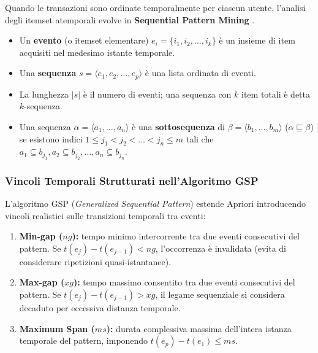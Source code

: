 Quando le transazioni sono ordinate temporalmente per ciascun utente, l'analisi degli itemset atemporali evolve in \textbf{Sequential Pattern Mining} \cite{agrawal1995}.
\begin{itemize}
    \item Un \textbf{evento} (o itemset elementare) $e_i = \{i_1, i_2, \dots, i_k\}$ è un insieme di item acquisiti nel medesimo istante temporale.
    \item Una \textbf{sequenza} $s = \langle e_1, e_2, \dots, e_p \rangle$ è una lista ordinata di eventi.
    \item La lunghezza $|s|$ è il numero di eventi; una sequenza con $k$ item totali è detta $k$-sequenza.
    \item Una sequenza $\alpha = \langle a_1, \dots, a_n \rangle$ è una \textbf{sottosequenza} di $\beta = \langle b_1, \dots, b_m \rangle$ ($\alpha \sqsubseteq \beta$) se esistono indici $1 \le j_1 < j_2 < \dots < j_n \le m$ tali che $a_1 \subseteq b_{j_1}, a_2 \subseteq b_{j_2}, \dots, a_n \subseteq b_{j_n}$.
\end{itemize}

\subsubsection{Vincoli Temporali Strutturati nell'Algoritmo GSP}
L'algoritmo GSP (\textit{Generalized Sequential Pattern}) estende Apriori introducendo vincoli realistici sulle transizioni temporali tra eventi:
\begin{enumerate}
    \item \textbf{Min-gap ($ng$):} tempo minimo intercorrente tra due eventi consecutivi del pattern. Se $t(e_j) - t(e_{j-1}) < ng$, l'occorrenza è invalidata (evita di considerare ripetizioni quasi-istantanee).
    \item \textbf{Max-gap ($xg$):} tempo massimo consentito tra due eventi consecutivi del pattern. Se $t(e_j) - t(e_{j-1}) > xg$, il legame sequenziale si considera decaduto per eccessiva distanza temporale.
    \item \textbf{Maximum Span ($ms$):} durata complessiva massima dell'intera istanza temporale del pattern, imponendo $t(e_p) - t(e_1) \le ms$.
\end{enumerate}

